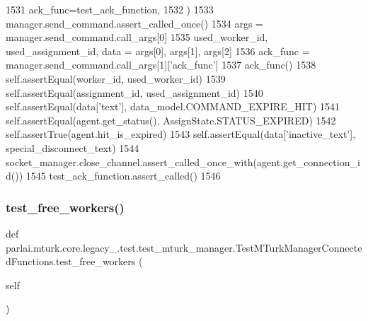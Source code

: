 \begin{DoxyCode}
1531             ack\_func=test\_ack\_function,
1532         )
1533         manager.send\_command.assert\_called\_once()
1534         args = manager.send\_command.call\_args[0]
1535         used\_worker\_id, used\_assignment\_id, data = args[0], args[1], args[2]
1536         ack\_func = manager.send\_command.call\_args[1][\textcolor{stringliteral}{'ack\_func'}]
1537         ack\_func()
1538         self.assertEqual(worker\_id, used\_worker\_id)
1539         self.assertEqual(assignment\_id, used\_assignment\_id)
1540         self.assertEqual(data[\textcolor{stringliteral}{'text'}], data\_model.COMMAND\_EXPIRE\_HIT)
1541         self.assertEqual(agent.get\_status(), AssignState.STATUS\_EXPIRED)
1542         self.assertTrue(agent.hit\_is\_expired)
1543         self.assertEqual(data[\textcolor{stringliteral}{'inactive\_text'}], special\_disconnect\_text)
1544         socket\_manager.close\_channel.assert\_called\_once\_with(agent.get\_connection\_id())
1545         test\_ack\_function.assert\_called()
1546 
\end{DoxyCode}
\mbox{\label{classparlai_1_1mturk_1_1core_1_1legacy__2018_1_1test_1_1test__mturk__manager_1_1TestMTurkManagerConnectedFunctions_a2d2fb85755e935067e5375124948215c}} 
\subsubsection{\texorpdfstring{test\+\_\+free\+\_\+workers()}{test\_free\_workers()}}
{\footnotesize\ttfamily def parlai.\+mturk.\+core.\+legacy\+\_.\+test.\+test\+\_\+mturk\+\_\+manager.\+Test\+M\+Turk\+Manager\+Connected\+Functions.\+test\+\_\+free\+\_\+workers (\begin{DoxyParamCaption}\item[{}]{self }\end{DoxyParamCaption})}




